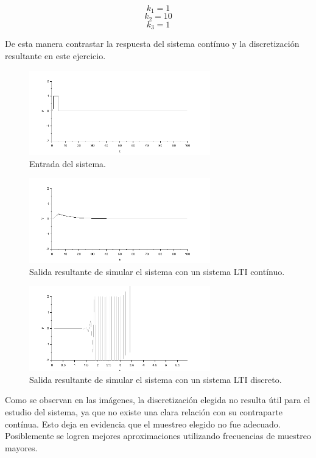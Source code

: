 \documentclass{article}
\begin{document}
$$ k_1 =1$$
$$k_2 =10$$
$$k_3=1$$

De esta manera contrastar la respuesta del sistema contínuo y la discretización resultante en este ejercicio.

        \begin{figure}[h!]
            \centering
            \includegraphics[width=0.7\textwidth]{amortiguador_entrada.png}
            \caption{Entrada del sistema.}
            \label{entrada}
        \end{figure}
        
         \begin{figure}[h!]
            \centering
            \includegraphics[width=0.7\textwidth]{amortiguador_10}
            \caption{Salida resultante de simular el sistema con un sistema LTI contínuo.}
            \label{sistemaContinuo}
        \end{figure}
        
              \begin{figure}[h!]
            \centering
            \includegraphics[width=0.7\textwidth]{discreto.png}
            \caption{Salida resultante de simular el sistema con un sistema LTI discreto.}
            \label{sistemaDiscreto}
        \end{figure}

Como se observan en las imágenes, la discretización elegida no resulta útil para el estudio del sistema, ya que no existe una clara relación con su contraparte contínua. Esto deja en evidencia que el muestreo elegido no fue adecuado. Posiblemente se logren mejores aproximaciones utilizando frecuencias de muestreo mayores.








    
\end{document}
